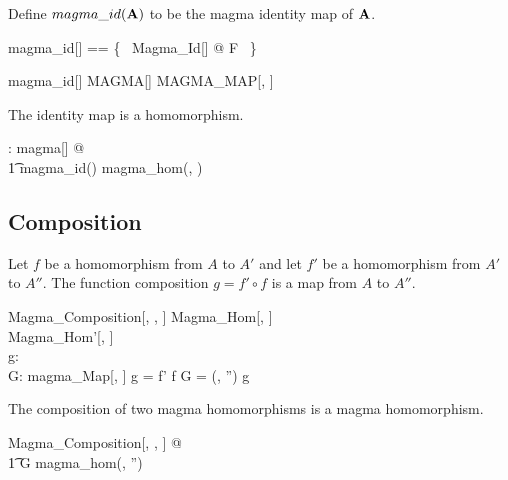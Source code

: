 \documentclass{amsart}
\begin{document}
Define $magma\_id(\mathbf{A})$ to be the magma identity map of $\mathbf{A}$.

\begin{zed}
	magma\_id[\genT] == \{~ Magma\_Id[\genT] @ \strucA \mapsto F  ~\} 
\end{zed}

\begin{remark}
\begin{zed}
magma\_id[\setT] \in MAGMA[\setT] \pfun MAGMA\_MAP[\setT, \setT]
\end{zed}
\end{remark}

\begin{remark}

The identity map is a homomorphism.

\begin{zed}
	\forall \strucA: magma[\setT] @ \\
	\t1	magma\_id(\strucA) \in magma\_hom(\strucA, \strucA)
\end{zed}

\end{remark}

\subsection{Composition}

Let $f$ be a homomorphism from $A$ to $A'$ and let $f'$ be a homomorphism from $A'$ to $A''$.
The function composition $g = f' \circ f$ is a map from $A$ to $A''$.

\begin{schema}{Magma\_Composition}[\genT, \genU, \genV]
	Magma\_Hom[\genT, \genU] \\
	Magma\_Hom'[\genU, \genV] \\
	g: \genT \pfun \genV  \\
	G: magma\_Map[\genT, \genV]
\where
	g = f' \circ f
\also
	G = (\strucA, \strucA'') \mapsto g
\end{schema}

\begin{remark}
The composition of two magma homomorphisms is a magma homomorphism.

\begin{zed}
	\forall Magma\_Composition[\setT, \setU, \setV] @ \\
	\t1	G \in magma\_hom(\strucA, \strucA'')
\end{zed}

\end{remark}
\end{document}
